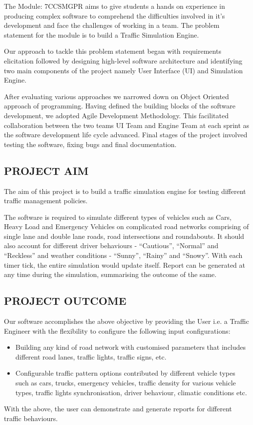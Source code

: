 \documentclass[11pt,a4paper]{article}
\begin{document}
	The Module: 7CCSMGPR aims to give students a hands on experience in 
	producing complex software to comprehend the
	difficulties involved in it’s development and face the challenges of
	working in a team. The problem statement for the module is to build a
	Traffic Simulation Engine. 
	
	\setlength{\parindent}{0cm}
	Our approach to tackle this problem statement began with
	requirements elicitation followed by designing high-level software
	architecture and identifying two main components of the project
	namely User Interface (UI) and Simulation Engine. 
	
	\setlength{\parindent}{0cm}
	After evaluating various approaches we narrowed down on Object
	Oriented approach of programming. Having defined the building
	blocks of the software development, we adopted Agile Development
	Methodology. This facilitated collaboration between the two teams 
	UI Team and Engine Team at each sprint as the software development
	life cycle advanced. Final stages of the project involved testing
	the software, fixing bugs and final documentation.

	\subsection{PROJECT AIM}	

	The aim of this project is to build a traffic simulation engine for
	testing different traffic management policies. 
	
	\setlength{\parindent}{0cm}
	The software is required to simulate different types of vehicles such
	as Cars, Heavy Load and Emergency Vehicles on complicated road
	networks comprising of single lane and double lane roads, road
	intersections and roundabouts. It should also account for different
	driver behaviours - “Cautious”, “Normal” and “Reckless” and weather
	conditions - “Sunny”, “Rainy” and “Snowy”. 
	With each timer tick, the entire simulation would update itself. Report
	can be generated at any time during the simulation, summarising the
	outcome of the same.

	\subsection{PROJECT OUTCOME}	

	Our software accomplishes the above objective by providing the User
	i.e. a Traffic Engineer with the flexibility to configure the
	following input configurations:
		\begin{itemize}
		\setlength\itemsep{0.2em}
			\item Building any kind of road network with customised parameters that includes different road lanes, traffic lights, traffic signs, etc. 
			\item Configurable traffic pattern options contributed by different vehicle types such as cars, trucks, emergency vehicles, traffic density for various vehicle types, traffic lights synchronisation, driver behaviour, climatic conditions etc. 
		\end{itemize}
	With the above, the user can demonstrate and generate
	reports for different traffic behaviours.	
\end{document}
